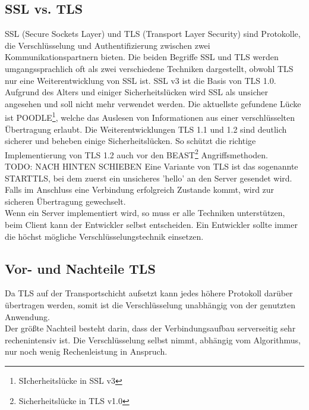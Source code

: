 

\subsection{SSL vs. TLS}
SSL (Secure Sockets Layer) und TLS (Transport Layer Security) sind Protokolle, die Verschlüsselung und Authentifizierung zwischen zwei Kommunikationspartnern bieten. Die beiden Begriffe SSL und TLS werden umgangssprachlich oft als zwei verschiedene Techniken dargestellt, obwohl TLS nur eine Weiterentwicklung von SSL ist. SSL v3 ist die Basis von TLS 1.0. \\
Aufgrund des Alters und einiger Sicherheitslücken wird SSL als unsicher angesehen und soll nicht mehr verwendet werden. Die aktuellste gefundene Lücke ist POODLE\footnote{SIcherheitslücke in SSL v3}, welche das Auslesen von Informationen aus einer verschlüsselten Übertragung erlaubt. Die Weiterentwicklungen TLS 1.1 und 1.2 sind deutlich sicherer und beheben einige Sicherheitslücken. So schützt die richtige Implementierung von TLS 1.2 auch vor den BEAST\footnote{Sicherheitslücke in TLS v1.0} Angriffsmethoden.\\
TODO: NACH HINTEN SCHIEBEN Eine Variante von TLS ist das sogenannte STARTTLS, bei dem zuerst ein unsicheres 'hello' an den Server gesendet wird. Falls im Anschluss eine Verbindung erfolgreich Zustande kommt, wird zur sicheren Übertragung gewechselt. \\
Wenn ein Server implementiert wird, so muss er alle Techniken unterstützen, beim Client kann der Entwickler selbst entscheiden. Ein Entwickler sollte immer die höchst mögliche Verschlüsselungstechnik einsetzen. \\

\subsection{Vor- und Nachteile TLS}
Da TLS auf der Transportschicht aufsetzt kann jedes höhere Protokoll darüber übertragen werden, somit ist die Verschlüsselung unabhängig von der genutzten Anwendung. \\
	Der größte Nachteil besteht darin, dass der Verbindungsaufbau serverseitig sehr rechenintensiv ist. Die Verschlüsselung selbst nimmt, abhängig vom Algorithmus, nur noch wenig Rechenleistung in Anspruch. \\

